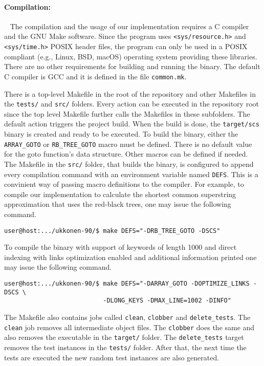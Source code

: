 \documentclass[english,twoside,censored,csm,algorithms-track-2020]{HYthesisML}
\theoremstyle{plain}
\theoremstyle{definition}
\begin{document}

\paragraph{Compilation:}~\label{usage}
The compilation and the usage of our implementation requires a C compiler and the GNU Make software.
Since the program uses \texttt{<sys/resource.h>} and \texttt{<sys/time.h>} POSIX header files,
the program can only
be used in a POSIX compliant (e.g., Linux, BSD, macOS) operating system providing these libraries.
There are no other
requirements for building and running the binary. The default C compiler is GCC and it is defined in the
file \texttt{common.mk}.

There is a top-level Makefile in the root of the repository and other Makefiles in the \texttt{tests/}
and \texttt{src/} folders. Every action can be executed in the repository root since the top level
Makefile further calls the Makefiles in these subfolders. The default action triggers the project build.
When the build is done, the \texttt{target/scs} binary is created and ready to be executed. To build
the binary, either the \texttt{ARRAY\_GOTO} or \texttt{RB\_TREE\_GOTO} macro must be defined.
There is no default value
for the goto function's data structure. Other macros can be defined if needed.
The Makefile in the \texttt{src/} folder, that builds the binary, is configured to append every
compilation command with an environment variable named \texttt{DEFS}. This is a convinient way of passing
macro definitions to the compiler. For example, to compile our implementation to calculate the
shortest common superstring approximation that uses the red-black trees, one may issue the following
command.

\begin{verbatim}
user@host:.../ukkonen-90/$ make DEFS="-DRB_TREE_GOTO -DSCS"
\end{verbatim}

To compile the binary with support of keywords of length 1000 and direct indexing with links
optimization enabled and additional information printed one may issue the following command.

\begin{verbatim}
user@host:.../ukkonen-90/$ make DEFS="-DARRAY_GOTO -DOPTIMIZE_LINKS -DSCS \
                           -DLONG_KEYS -DMAX_LINE=1002 -DINFO"
\end{verbatim}

The Makefile also contains jobs called \texttt{clean}, \texttt{clobber} and \texttt{delete\_tests}.
The \texttt{clean} job removes all
intermediate object files. The \texttt{clobber} does the same and also removes the executable in the
\texttt{target/} folder. The \texttt{delete\_tests} target removes the test instances in the
\texttt{tests/}
folder. After that, the next time the tests are executed the new random test instances are
also generated.
\end{document}
